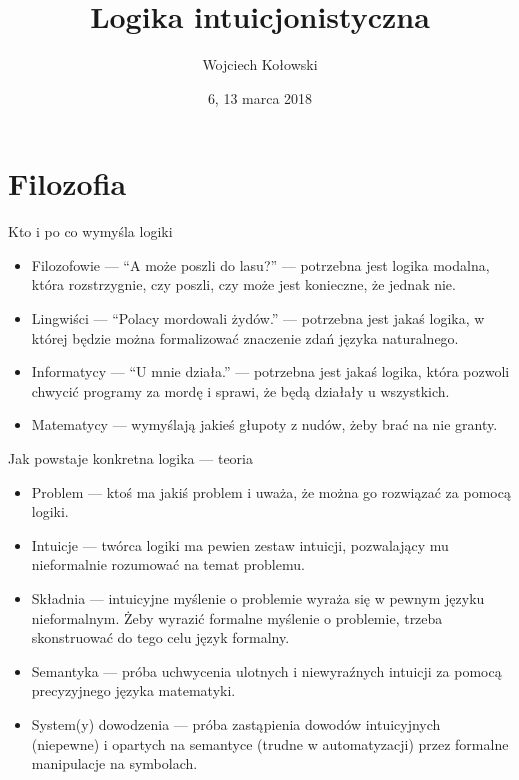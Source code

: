\documentclass{beamer}
\title{Logika intuicjonistyczna}
\author{Wojciech Kołowski}
\date{6, 13 marca 2018}
\begin{document}
\frame{\titlepage}
\frame{\tableofcontents}

\section{Filozofia}

\begin{frame}{Kto i po co wymyśla logiki}
\begin{itemize}
	\item Filozofowie — ``A może poszli do lasu?'' — potrzebna jest logika modalna, która rozstrzygnie, czy poszli, czy może jest konieczne, że jednak nie.
	\item Lingwiści — ``Polacy mordowali żydów.'' — potrzebna jest jakaś logika, w której będzie można formalizować znaczenie zdań języka naturalnego.
	\item Informatycy — ``U mnie działa.'' — potrzebna jest jakaś logika, która pozwoli chwycić programy za mordę i sprawi, że będą działały u wszystkich.
	\item Matematycy — wymyślają jakieś głupoty z nudów, żeby brać na nie granty.
\end{itemize}
\end{frame}

\begin{frame}{Jak powstaje konkretna logika — teoria}
\begin{itemize}
	\item Problem — ktoś ma jakiś problem i uważa, że można go rozwiązać za pomocą logiki.
	\item Intuicje — twórca logiki ma pewien zestaw intuicji, pozwalający mu nieformalnie rozumować na temat problemu.
	\item Składnia — intuicyjne myślenie o problemie wyraża się w pewnym języku nieformalnym. Żeby wyrazić formalne myślenie o problemie, trzeba skonstruować do tego celu język formalny.
	\item Semantyka — próba uchwycenia ulotnych i niewyraźnych intuicji za pomocą precyzyjnego języka matematyki.
	\item System(y) dowodzenia — próba zastąpienia dowodów intuicyjnych (niepewne) i opartych na semantyce (trudne w automatyzacji) przez formalne manipulacje na symbolach.
\end{itemize}
\end{frame}
\end{document}
